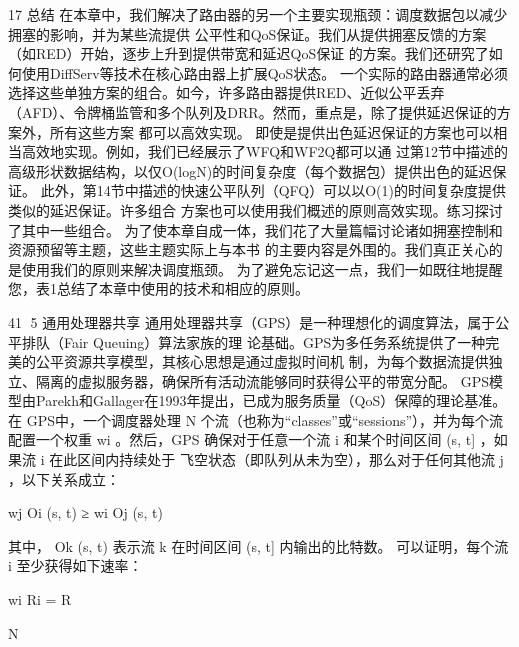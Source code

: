 17 总结
在本章中，我们解决了路由器的另一个主要实现瓶颈：调度数据包以减少拥塞的影响，并为某些流提供
公平性和QoS保证。我们从提供拥塞反馈的方案（如RED）开始，逐步上升到提供带宽和延迟QoS保证
的方案。我们还研究了如何使用DiffServ等技术在核心路由器上扩展QoS状态。
一个实际的路由器通常必须选择这些单独方案的组合。如今，许多路由器提供RED、近似公平丢弃
（AFD）、令牌桶监管和多个队列及DRR。然而，重点是，除了提供延迟保证的方案外，所有这些方案
都可以高效实现。
即使是提供出色延迟保证的方案也可以相当高效地实现。例如，我们已经展示了WFQ和WF2Q都可以通
过第12节中描述的高级形状数据结构，以仅O(logN)的时间复杂度（每个数据包）提供出色的延迟保证。
此外，第14节中描述的快速公平队列（QFQ）可以以O(1)的时间复杂度提供类似的延迟保证。许多组合
方案也可以使用我们概述的原则高效实现。练习探讨了其中一些组合。
为了使本章自成一体，我们花了大量篇幅讨论诸如拥塞控制和资源预留等主题，这些主题实际上与本书
的主要内容是外围的。我们真正关心的是使用我们的原则来解决调度瓶颈。
为了避免忘记这一点，我们一如既往地提醒您，表1总结了本章中使用的技术和相应的原则。




                                                 41
5 通用处理器共享
通用处理器共享（GPS）是一种理想化的调度算法，属于公平排队（Fair Queuing）算法家族的理
论基础。GPS为多任务系统提供了一种完美的公平资源共享模型，其核心思想是通过虚拟时间机
制，为每个数据流提供独立、隔离的虚拟服务器，确保所有活动流能够同时获得公平的带宽分配。
GPS模型由Parekh和Gallager在1993年提出，已成为服务质量（QoS）保障的理论基准。
在 GPS中，一个调度器处理 N 个流（也称为“classes”或“sessions”），并为每个流配置一个权重
wi 。然后，GPS 确保对于任意一个流 i 和某个时间区间 (s, t] ，如果流 i 在此区间内持续处于
飞空状态（即队列从未为空），那么对于任何其他流 j ，以下关系成立：
  ​




                      wj Oi (s, t) ≥ wi Oj (s, t)
                         ​    ​                   ​           ​




其中， Ok (s, t) 表示流 k 在时间区间 (s, t] 内输出的比特数。
可以证明，每个流 i 至少获得如下速率：
      ​




                                        wi
                             Ri =             R
                                          ​




                                       N
                                  ​                       ​




